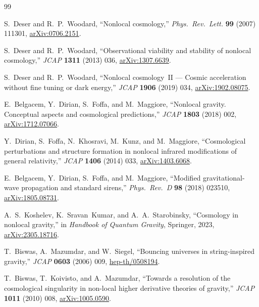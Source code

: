 \documentclass[12pt,a4paper]{article}
\theoremstyle{definition}
\theoremstyle{remark}
\begin{document}
\begin{thebibliography}{99}

S.~Deser and R.~P.~Woodard,
``Nonlocal cosmology,''
\emph{Phys.\ Rev.\ Lett.} \textbf{99} (2007) 111301,
\href{https://arxiv.org/abs/0706.2151}{arXiv:0706.2151}.

S.~Deser and R.~P.~Woodard,
``Observational viability and stability of nonlocal cosmology,''
\emph{JCAP} \textbf{1311} (2013) 036,
\href{https://arxiv.org/abs/1307.6639}{arXiv:1307.6639}.

S.~Deser and R.~P.~Woodard,
``Nonlocal cosmology~II --- Cosmic acceleration without fine tuning
or dark energy,''
\emph{JCAP} \textbf{1906} (2019) 034,
\href{https://arxiv.org/abs/1902.08075}{arXiv:1902.08075}.

E.~Belgacem, Y.~Dirian, S.~Foffa, and M.~Maggiore,
``Nonlocal gravity. Conceptual aspects and cosmological predictions,''
\emph{JCAP} \textbf{1803} (2018) 002,
\href{https://arxiv.org/abs/1712.07066}{arXiv:1712.07066}.

Y.~Dirian, S.~Foffa, N.~Khosravi, M.~Kunz, and M.~Maggiore,
``Cosmological perturbations and structure formation in nonlocal
infrared modifications of general relativity,''
\emph{JCAP} \textbf{1406} (2014) 033,
\href{https://arxiv.org/abs/1403.6068}{arXiv:1403.6068}.

E.~Belgacem, Y.~Dirian, S.~Foffa, and M.~Maggiore,
``Modified gravitational-wave propagation and standard sirens,''
\emph{Phys.\ Rev.\ D} \textbf{98} (2018) 023510,
\href{https://arxiv.org/abs/1805.08731}{arXiv:1805.08731}.

A.~S.~Koshelev, K.~Sravan~Kumar, and A.~A.~Starobinsky,
``Cosmology in nonlocal gravity,''
in \emph{Handbook of Quantum Gravity}, Springer, 2023,
\href{https://arxiv.org/abs/2305.18716}{arXiv:2305.18716}.

T.~Biswas, A.~Mazumdar, and W.~Siegel,
``Bouncing universes in string-inspired gravity,''
\emph{JCAP} \textbf{0603} (2006) 009,
\href{https://arxiv.org/abs/hep-th/0508194}{hep-th/0508194}.

T.~Biswas, T.~Koivisto, and A.~Mazumdar,
``Towards a resolution of the cosmological singularity in non-local
higher derivative theories of gravity,''
\emph{JCAP} \textbf{1011} (2010) 008,
\href{https://arxiv.org/abs/1005.0590}{arXiv:1005.0590}.


\end{thebibliography}
\end{document}
